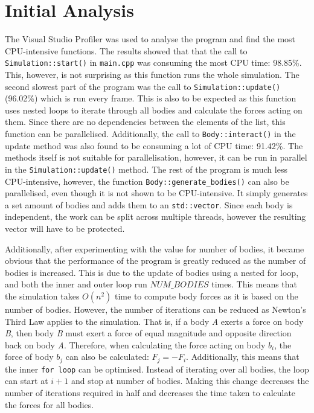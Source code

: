 \documentclass[12pt, a4paper]{article}
\begin{document}
    \section{Initial Analysis}     
    The Visual Studio Profiler was used to analyse the program and find the most CPU-intensive functions. The results showed that that the call to \texttt{Simulation::start()} in \texttt{main.cpp} was consuming the most CPU time: 98.85\%. This, however, is not surprising as this function runs the whole simulation. The second slowest part of the program was the call to \texttt{Simulation::update()} (96.02\%) which is run every frame. This is also to be expected as this function uses nested loops to iterate through all bodies and calculate the forces acting on them. Since there are no dependencies between the elements of the list, this function can be parallelised. Additionally, the call to \texttt{Body::interact()} in the update method was also found to be consuming a lot of CPU time: 91.42\%. The methods itself is not suitable for parallelisation, however, it can be run in parallel in the \texttt{Simulation::update()} method. The rest of the program is much less CPU-intensive, however, the function \texttt{Body::generate\_bodies()} can also be parallelised, even though it is not shown to be CPU-intensive. It simply generates a set amount of bodies and adds them to an \texttt{std::vector}. Since each body is independent, the work can be split across multiple threads, however the resulting vector will have to be protected.

    Additionally, after experimenting with the value for number of bodies, it became obvious that the performance of the program is greatly reduced as the number of bodies is increased. This is due to the update of bodies using a nested for loop, and both the inner and outer loop run $NUM\_BODIES$ times. This means that the simulation takes $O(n^2)$ time to compute body forces as it is based on the number of bodies. However, the number of iterations can be reduced as Newton's Third Law applies to the simulation. That is, if a body \textit{A} exerts a force on body \textit{B}, then body \textit{B} must exert a force of equal magnitude and opposite direction back on body \textit{A}. Therefore, when calculating the force acting on body $b_i$, the force of body $b_j$ can also be calculated: $F_j = -F_i$. Additionally, this means that the inner \texttt{for loop} can be optimised. Instead of iterating over all bodies, the loop can start at $i+1$ and stop at number of bodies. Making this change decreases the number of iterations required in half and decreases the time taken to calculate the forces for all bodies.
\end{document}
